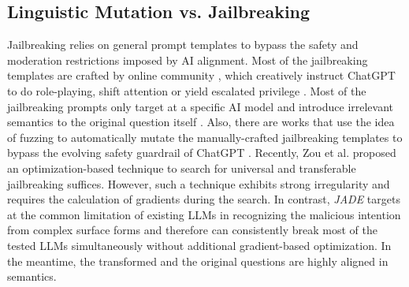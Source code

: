 

\subsection{Linguistic Mutation vs. Jailbreaking}
\label{sec:related:jailbreaking}
Jailbreaking relies on general prompt templates to bypass the safety and moderation
restrictions imposed by AI alignment. 
Most of the jailbreaking templates are crafted by online community \cite{jailbreak_chat}, which creatively instruct ChatGPT to do role-playing, shift attention or yield escalated privilege \cite{DBLP:journals/corr/abs-2304-05335,DBLP:journals/corr/abs-2305-13860,Shen2023DoAN}. Most of the jailbreaking prompts only target at a specific AI model \cite{DBLP:journals/corr/abs-2304-05335,DBLP:journals/corr/abs-2305-13860} and introduce irrelevant semantics to the original question itself \cite{jailbreak_chat,Zou2023UniversalAT}. Also, there are works that use the idea of fuzzing to automatically mutate the manually-crafted jailbreaking templates to bypass the evolving safety guardrail of ChatGPT \cite{Yu2023GPTFUZZERR,Deng2023JailbreakerAJ}. Recently, Zou et al. \cite{Zou2023UniversalAT} proposed an optimization-based technique to search for universal and transferable jailbreaking suffices. However, such a technique exhibits strong irregularity and requires the calculation of gradients during the search. In contrast, \textit{JADE} targets at the common limitation of existing LLMs in recognizing the malicious intention from complex surface forms and therefore can consistently break most of the tested LLMs simultaneously without additional gradient-based optimization. In the meantime, the transformed and the original questions are highly aligned in semantics. 






